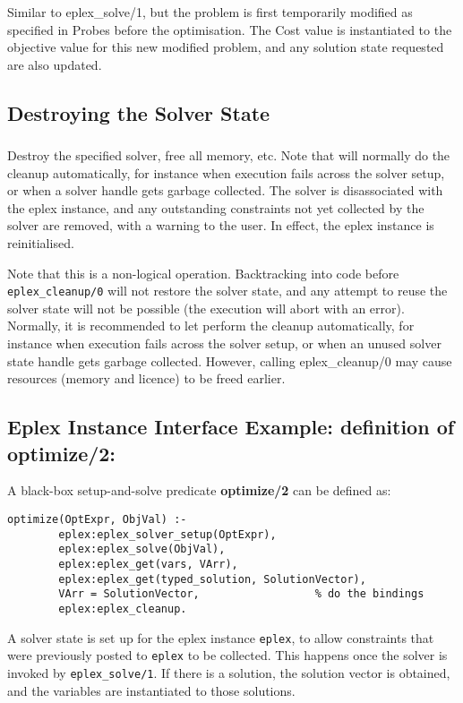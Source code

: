 \subsubsection{}
Similar to eplex_solve/1, but the problem is first temporarily modified as
specified in Probes before the optimisation. The Cost value
is instantiated to the objective value for this new modified problem, and
any solution state requested are also updated. 

\subsection{Destroying the Solver State}
\subsubsection{}

Destroy the specified solver, free all memory, etc.
Note that {\eclipse} will normally do the cleanup automatically,
for instance when execution fails across the solver setup, or
when a solver handle gets garbage collected. The solver is disassociated
with the eplex instance, and any outstanding constraints not yet collected
by the  solver are removed, with a warning to the user. In effect, the
eplex instance is reinitialised.

Note that this is a non-logical operation. Backtracking into code before 
{\tt eplex_cleanup/0} will not restore the solver state, and any attempt to
reuse the solver state will not be possible (the execution will abort with
an error). Normally, it is recommended to let {\eclipse} perform the cleanup 
automatically,
for instance when execution fails across the solver setup, or
when an unused solver state handle gets garbage collected.
However, calling eplex_cleanup/0 may
cause resources (memory and licence) to be freed earlier.

\subsection{Eplex Instance Interface Example: definition of optimize/2:}
\label{defoptimize}
A black-box setup-and-solve predicate {\bf optimize/2} can be defined as:
\begin{verbatim}
optimize(OptExpr, ObjVal) :-
        eplex:eplex_solver_setup(OptExpr),
        eplex:eplex_solve(ObjVal),
        eplex:eplex_get(vars, VArr),
        eplex:eplex_get(typed_solution, SolutionVector),
        VArr = SolutionVector,                  % do the bindings
        eplex:eplex_cleanup.
\end{verbatim}
A solver state is set up for the eplex instance {\tt eplex}, to allow
constraints that were previously posted to {\tt eplex} to be collected.
This happens once the solver is invoked by {\tt eplex_solve/1}. If there
is a solution, the solution vector is obtained, and the
variables are instantiated to those solutions.


